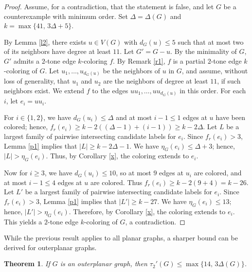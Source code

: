\documentclass[12pt]{article}
\theoremstyle{plain}
\newtheorem{theorem}{Theorem}
\numberwithin{theorem}{section}
\numberwithin{conjecture}{section}
\numberwithin{corollary}{section}
\numberwithin{example}{section}
\numberwithin{lemma}{section}
\numberwithin{proposition}{section}
\numberwithin{problem}{section}
\numberwithin{remark}{section}
\numberwithin{claim}{theorem}
\numberwithin{definition}{section}
\begin{document}
\begin{proof}
Assume, for a contradiction, that the statement is false, and let $G$ be a counterexample with minimum order. Set $\Delta=\Delta(G)$ and $k=\max\{41,\,3\Delta+5\}$. 

\noindent By Lemma \ref{l2}, there exists $u\in V(G)$ with $d_G(u)\le 5$ such that at most two of its neighbors have degree at least $11$. Let $G'=G-u$. By the minimality of $G$, $G'$ admits a $2$-tone edge $k$-coloring $f$. By Remark \ref{r1}, $f$ is a partial $2$-tone edge $k$-coloring of $G$. Let $u_1,\dots,u_{d_G(u)}$ be the neighbors of $u$ in $G$, and assume, without loss of generality, that $u_1$ and $u_2$ are the neighbors of degree at least $11$, if such neighbors exist. We extend $f$ to the edges $uu_1,\dots,uu_{d_G(u)}$ in this order. For each $i$, let $e_i=uu_i$.

\noindent For $i\in\{1,2\}$, we have $d_G(u_i)\le \Delta$ and at most $i-1\le 1$ edges at $u$ have been colored; hence, $f_r(e_i)\ge k-2((\Delta-1)+(i-1))\ge k-2\Delta$. Let $L$ be a largest family of pairwise intersecting candidate labels for $e_i$. Since $f_r(e_i) > 3$, Lemma \ref{p1} implies that $|L| \ge k-2\Delta-1$. We have $\eta_G(e_i) \le \Delta +3$; hence, $|L|>\eta_G(e_i)$. Thus, by Corollary \ref{x}, the coloring extends to $e_i$.

\noindent Now for $i\ge 3$, we have $d_G(u_i)\le 10$, so at most $9$ edges at $u_i$ are colored, and at most $i-1\le 4$ edges at $u$ are colored. Thus $f_r(e_i)\ge k-2(9+4)=k-26$. Let $L'$ be a largest family of pairwise intersecting candidate labels for $e_i$. Since $f_r(e_i)> 3$, Lemma \ref{p1} implies that $|L'| \ge k-27$. We have $\eta_G(e_i)\le 13$; hence, $|L'|>\eta_G(e_i)$. Therefore, by Corollary \ref{x}, the coloring extends to $e_i$. This yields a $2$-tone edge $k$-coloring of $G$, a contradiction.\end{proof}

While the previous result applies to all planar graphs, a sharper bound can be derived for outerplanar graphs.

\begin{theorem}\label{t4}
If $G$ is an outerplanar graph, then $\tau_2'(G)\le \max\{14,\,3\Delta(G)\}$.
\end{theorem}
\end{document}
